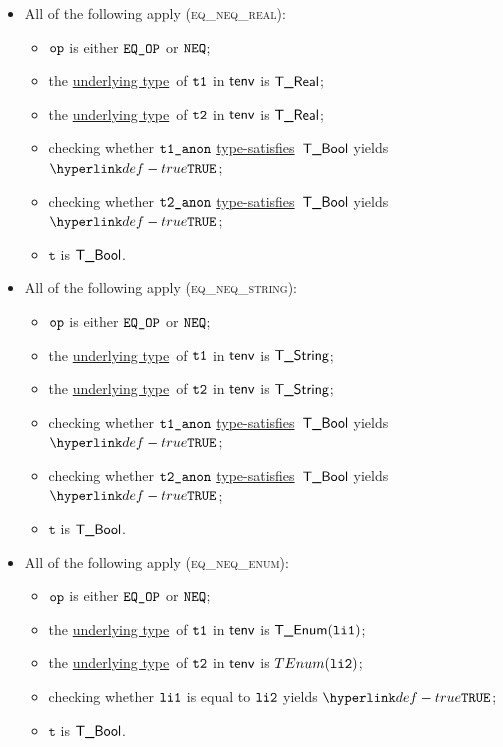 \documentclass{book}
\newcommand\ProseOrTypeError[0]{\ProseTerminateAs{\TypeErrorConfig}}
\newcommand\underlyingtype[0]{\hyperlink{def-underlyingtype}{underlying type}}
\newcommand\typesatisfies[0]{\hyperlink{def-typesatisfies}{type-satisfies}}
\newcommand\vt[0]{\texttt{t}}
\begin{document}
\begin{itemize}
  \item All of the following apply (\textsc{eq\_neq\_real}):
  \begin{itemize}
    \item $\texttt{op}$ is either $\texttt{EQ\_OP}$ or $\texttt{NEQ}$;
    \item the \underlyingtype\ of $\texttt{t1}$ in $\textsf{tenv}$ is $\textsf{T\_Real}$\ProseOrTypeError;
    \item the \underlyingtype\ of $\texttt{t2}$ in $\textsf{tenv}$ is $\textsf{T\_Real}$\ProseOrTypeError;
    \item checking whether $\texttt{t1\_anon}$ \typesatisfies\ $\textsf{T\_Bool}$ yields $\True$\ProseOrTypeError;
    \item checking whether $\texttt{t2\_anon}$ \typesatisfies\ $\textsf{T\_Bool}$ yields $\True$\ProseOrTypeError;
    \item $\vt$ is $\textsf{T\_Bool}$.
  \end{itemize}

  \item All of the following apply (\textsc{eq\_neq\_string}):
  \begin{itemize}
    \item $\texttt{op}$ is either $\texttt{EQ\_OP}$ or $\texttt{NEQ}$;
    \item the \underlyingtype\ of $\texttt{t1}$ in $\textsf{tenv}$ is $\textsf{T\_String}$\ProseOrTypeError;
    \item the \underlyingtype\ of $\texttt{t2}$ in $\textsf{tenv}$ is $\textsf{T\_String}$\ProseOrTypeError;
    \item checking whether $\texttt{t1\_anon}$ \typesatisfies\ $\textsf{T\_Bool}$ yields $\True$\ProseOrTypeError;
    \item checking whether $\texttt{t2\_anon}$ \typesatisfies\ $\textsf{T\_Bool}$ yields $\True$\ProseOrTypeError;
    \item $\vt$ is $\textsf{T\_Bool}$.
  \end{itemize}

  \item All of the following apply (\textsc{eq\_neq\_enum}):
  \begin{itemize}
    \item $\texttt{op}$ is either $\texttt{EQ\_OP}$ or $\texttt{NEQ}$;
    \item the \underlyingtype\ of $\texttt{t1}$ in $\textsf{tenv}$ is $\textsf{T\_Enum}(\texttt{li1})$\ProseOrTypeError;
    \item the \underlyingtype\ of $\texttt{t2}$ in $\textsf{tenv}$ is $\\TEnum(\texttt{li2})$\ProseOrTypeError;
    \item checking whether $\texttt{li1}$ is equal to $\texttt{li2}$ yields $\True$\ProseOrTypeError;
    \item $\vt$ is $\textsf{T\_Bool}$.
  \end{itemize}


\end{itemize}
\end{document}
